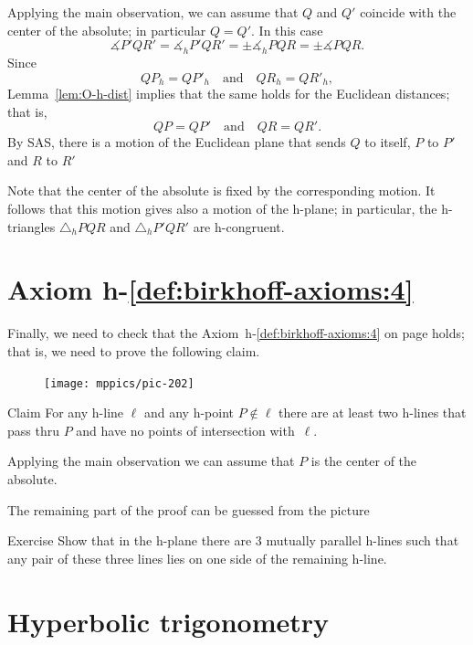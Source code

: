 Applying the main observation, 
we can assume that $Q$ and $Q'$ coincide with the center of the absolute; in particular $Q=Q'$.
In this case 
$$\measuredangle P' Q R'=\measuredangle_h P' Q R'=\pm\measuredangle_h P Q R=\pm\measuredangle P Q R.$$
Since 
$$Q P_h=Q P'_h\quad \text{and}\quad Q R_h=Q R'_h,$$
Lemma~\ref{lem:O-h-dist} implies that the same holds for the Euclidean distances;
that is,
$$Q P=Q P'
\quad
\text{and}
\quad
Q R=Q R'.$$
By SAS,
there is a motion of the Euclidean plane that sends $Q$ to itself, $P$ to $P'$ and $R$ to $R'$

Note that the center of the absolute is fixed by the corresponding motion.
It follows that this motion gives also a motion of the h-plane;
in particular, the h-triangles 
$\triangle_h P Q R$ and $\triangle_h P' Q R'$ are h-congruent.
\qeds

\section*{Axiom h-$\!$\ref{def:birkhoff-axioms:4}}


Finally, we need to check that the Axiom~h-$\!$\ref{def:birkhoff-axioms:4} on page \pageref{def:hyperbolic-4a} holds;
that is, we need to prove the following claim.

{

\begin{figure}
\vskip-0mm
\centering
\texttt{[image: mppics/pic-202]}
\end{figure}

\begin{thm}{Claim}
For any h-line $\ell$ and any h-point $P\notin\ell$ there are at least two h-lines that pass thru $P$ 
and have no points of intersection with~$\ell$.
\end{thm}

Applying the main observation we can assume that $P$ is the center of the absolute.

The remaining part of the proof can be guessed from the picture
\qeds

}

\begin{thm}{Exercise}\label{ex:3-h-lines}
Show that in the h-plane 
there are 3 mutually parallel h-lines 
such that any pair of these three lines lies on one side of the remaining h-line.
\end{thm}
 
\section*{Hyperbolic trigonometry}

